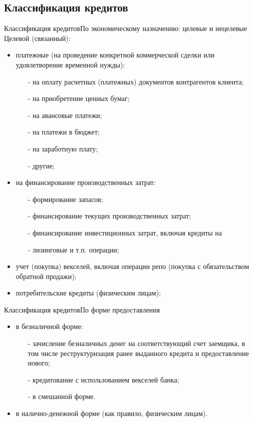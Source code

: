 \documentclass[_DKB_p2_Credit.tex]{subfiles}
\begin{document}
\subsection{Классификация кредитов}
\begin{frame}[allowframebreaks]{{Классификация кредитов}}{По экономическому назначению: целевые и нецелевые}
Целевой (связанный):
\begin{itemize}
\item 
платежные (на проведение конкретной коммерческой сделки или удовлетворение временной нужды):
\begin{enumerate}
\item[-] 
на оплату расчетных (платежных) документов контрагентов клиента;
\item[-] 
на приобретение ценных бумаг;
\item[-] 
на авансовые платежи;
\item[-] 
на платежи в бюджет;
\item[-] 
на заработную плату;
\item[-] 
другие;
\end{enumerate}
\pagebreak
\item
на финансирование производственных затрат:
\begin{enumerate}
\item[-] 
формирование запасов;
\item[-] 
финансирование текущих производственных затрат;
\item[-] 
финансирование инвестиционных затрат, включая кредиты на \item[-] 
лизинговые и т.п. операции;
\end{enumerate}
\item
учет (покупка) векселей, включая операции репо (покупка с обязательством обратной продажи);
\item
потребительские кредиты (физическим лицам);
\end{itemize}
\end{frame}

\begin{frame}{Классификация кредитов}{По форме предоставления}
\begin{itemize}
\item
в безналичной форме:
\begin{enumerate}
\item[-]
зачисление безналичных денег на соответствующий счет заемщика, в том числе реструктуризация ранее выданного кредита и предоставление нового;
\item[-]
кредитование с использованием векселей банка;
\item[-]
в смешанной форме.
\end{enumerate}
\item
в налично-денежной форме (как правило, физическим лицам).
\end{itemize}
\end{frame}
\end{document}
